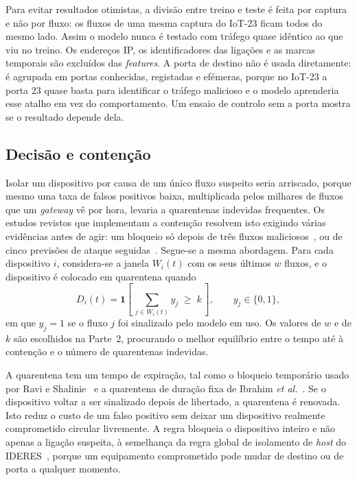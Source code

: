 \documentclass[conference,a4paper]{IEEEtran}
\begin{document}
Para evitar resultados otimistas, a divisão entre treino e teste é feita por captura e
não por fluxo: os fluxos de uma mesma captura do IoT-23 ficam todos do mesmo lado. Assim
o modelo nunca é testado com tráfego quase idêntico ao que viu no treino. Os endereços
IP, os identificadores das ligações e as marcas temporais são excluídos das
\textit{features}. A porta de destino não é usada diretamente: é agrupada em portas
conhecidas, registadas e efémeras, porque no IoT-23 a porta 23 quase basta para
identificar o tráfego malicioso e o modelo aprenderia esse atalho em vez do
comportamento. Um ensaio de controlo sem a porta mostra se o resultado depende dela.

\subsection{Decisão e contenção}\label{sec:decisao}
Isolar um dispositivo por causa de um único fluxo suspeito seria arriscado, porque
mesmo uma taxa de falsos positivos baixa, multiplicada pelos milhares de fluxos que um
\textit{gateway} vê por hora, levaria a quarentenas indevidas frequentes. Os estudos
revistos que implementam a contenção resolvem isto exigindo várias evidências antes de
agir: um bloqueio só depois de três fluxos maliciosos~\cite{ramirezmartinez2025p4}, ou
de cinco previsões de ataque seguidas~\cite{andrade2024ddos}. Segue-se a mesma
abordagem. Para cada dispositivo $i$, considera-se a janela $W_i(t)$ com os seus
últimos $w$ fluxos, e o dispositivo é colocado em quarentena quando
\begin{equation}
D_i(t) = \mathbf{1}\left[\,\sum_{j \in W_i(t)} y_j \;\ge\; k\,\right],
\qquad y_j \in \{0,1\},
\label{eq:decisao}
\end{equation}
em que $y_j = 1$ se o fluxo $j$ foi sinalizado pelo modelo em uso. Os valores de $w$ e de
$k$ são escolhidos na Parte~2, procurando o melhor equilíbrio entre o tempo até à
contenção e o número de quarentenas indevidas.

A quarentena tem um tempo de expiração, tal como o bloqueio temporário usado por Ravi
e Shalinie~\cite{ravi2020semisupervised} e a quarentena de duração fixa de Ibrahim
\textit{et al.}~\cite{ibrahim2026purechain}. Se o dispositivo voltar a ser sinalizado
depois de libertado, a quarentena é renovada. Isto reduz o custo de um falso positivo
sem deixar um dispositivo realmente comprometido circular livremente. A regra bloqueia
o dispositivo inteiro e não apenas a ligação suspeita, à semelhança da regra global de
isolamento de \textit{host} do IDERES~\cite{rose2022ideres}, porque um equipamento
comprometido pode mudar de destino ou de porta a qualquer momento.
\end{document}
